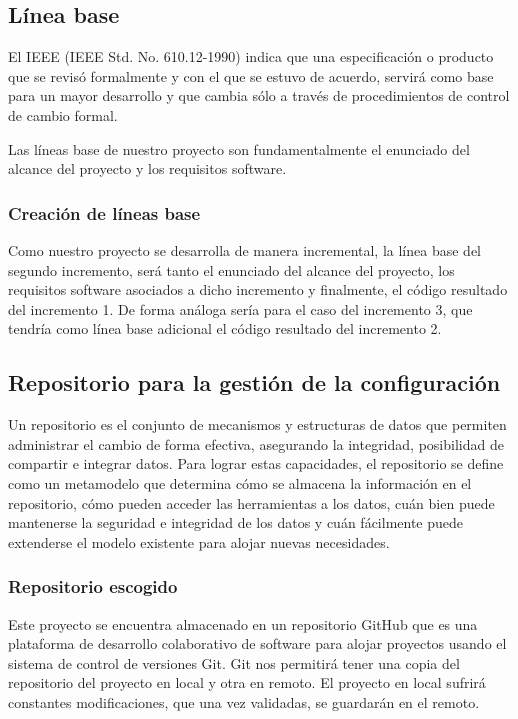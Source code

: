 \subsection{Línea base}
El IEEE (IEEE Std. No. 610.12-1990) indica que una especificación o producto que se revisó formalmente y con el que se estuvo de acuerdo, servirá como base para un mayor desarrollo y que cambia sólo a través de procedimientos de control de cambio formal.


Las líneas base de nuestro proyecto son fundamentalmente el enunciado del alcance del proyecto y los requisitos software.

\subsubsection{Creación de líneas base}
Como nuestro proyecto se desarrolla de manera incremental, la línea base del segundo incremento, será tanto el enunciado del alcance del proyecto, los requisitos software asociados a dicho incremento y finalmente, el código resultado del incremento 1. De forma análoga sería para el caso del incremento 3, que tendría como línea base adicional el código resultado del incremento 2.

\subsection{Repositorio para la gestión de la configuración}
Un repositorio es el conjunto de mecanismos y estructuras de datos que permiten administrar el cambio de forma efectiva, asegurando la integridad, posibilidad de compartir e integrar datos. Para lograr estas capacidades, el repositorio se define como un metamodelo que determina cómo se almacena la información en el repositorio, cómo pueden acceder las herramientas a los datos, cuán bien puede mantenerse la seguridad e integridad de los datos y cuán fácilmente puede extenderse el modelo existente para alojar nuevas necesidades\cite{pressman}.

\subsubsection{Repositorio escogido}
Este proyecto se encuentra almacenado en un repositorio GitHub que es una plataforma de desarrollo colaborativo de software para alojar proyectos usando el sistema de control de versiones Git\cite{github}. Git nos permitirá tener una copia del repositorio del proyecto en local y otra en remoto. El proyecto en local sufrirá constantes modificaciones, que una vez validadas, se guardarán en el remoto.

